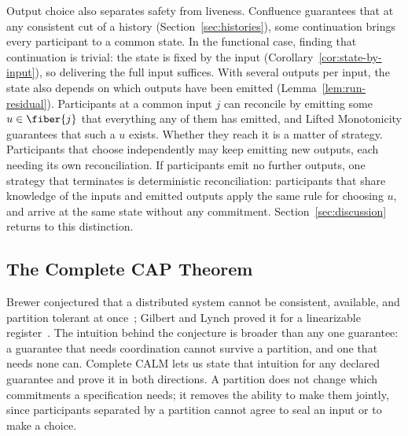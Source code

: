 Output choice also separates safety from liveness.  Confluence guarantees that
at any consistent cut of a history (Section~\ref{sec:histories}), some continuation brings every
participant to a common state.  In the functional case, finding that
continuation is trivial: the state is
fixed by the input (Corollary~\ref{cor:state-by-input}), so delivering the
full input suffices.  With several outputs per input, the state also depends on
which outputs have been emitted (Lemma~\ref{lem:run-residual}).  Participants at
a common input $j$ can reconcile by emitting some $u\in\fiber{j}$ that \outrel
everything any of them has emitted, and Lifted Monotonicity guarantees that
such a $u$ exists.
Whether they reach it is a matter of strategy.  Participants that choose
independently may keep emitting new outputs, each needing its own
reconciliation.  If participants emit no further outputs, one strategy that
terminates is deterministic reconciliation: participants that share knowledge of the
inputs and emitted outputs apply the same rule for choosing $u$, and arrive at
the same state without any commitment.  Section~\ref{sec:discussion} returns to this distinction.

\subsection{The Complete CAP Theorem}
\label{sec:cap-corollary}

Brewer conjectured that a distributed system cannot be consistent, available,
and partition tolerant at once~\cite{brewer2000towards}; Gilbert and Lynch
proved it for a linearizable register~\cite{gilbert2002cap}.  The intuition
behind the conjecture is broader than any one guarantee: a guarantee that
needs coordination cannot survive a partition, and one that needs none can.
Complete CALM lets us state that intuition for any declared guarantee and
prove it in both directions.  A partition does not change which commitments a
specification needs; it removes the ability to make them jointly, since
participants separated by a partition cannot agree to seal an input or to make
a choice.

